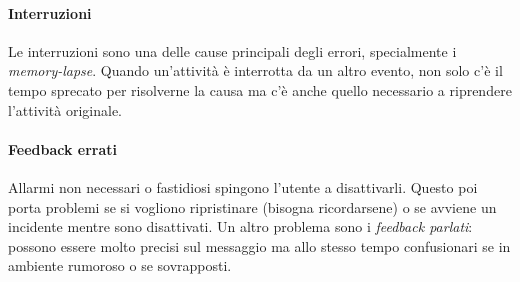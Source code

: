 \paragraph{Interruzioni} Le interruzioni sono una delle cause principali degli errori, specialmente i \textit{memory-lapse}. Quando un'attività è interrotta da un altro evento, non solo c'è il tempo sprecato per risolverne la causa ma c'è anche quello necessario a riprendere l'attività originale.

\paragraph{Feedback errati} Allarmi non necessari o fastidiosi spingono l'utente a disattivarli. Questo poi porta problemi se si vogliono ripristinare (bisogna ricordarsene) o se avviene un incidente mentre sono disattivati. Un altro problema sono i \textit{feedback parlati}: possono essere molto precisi sul messaggio ma allo stesso tempo confusionari se in ambiente rumoroso o se sovrapposti.

